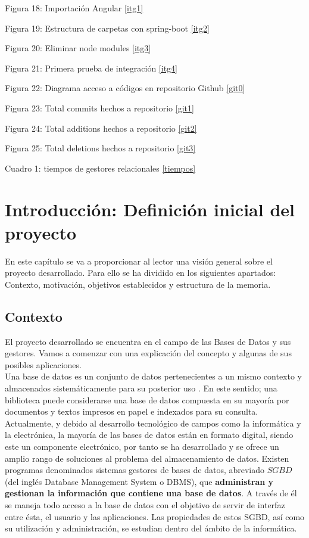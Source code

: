 \documentclass[12pt,a4paper]{article}
\begin{document}
Figura 18: Importación Angular \ref{itg1}

Figura 19: Estructura de carpetas con spring-boot \ref{itg2}

Figura 20: Eliminar node modules \ref{itg3}

Figura 21: Primera prueba de integración \ref{itg4}

Figura 22: Diagrama acceso a códigos en repositorio Github \ref{git0}

Figura 23: Total commits hechos a repositorio  \ref{git1}

Figura 24: Total additions hechos a repositorio \ref{git2}

Figura 25: Total deletions hechos a repositorio \ref{git3}

Cuadro 1: tiempos de gestores relacionales \ref{tiempos}
	






\newpage
\section{Introducción: Definición inicial del proyecto} \label{intro}

En este capítulo se va a proporcionar al lector una visión general sobre el proyecto desarrollado. Para ello se ha dividido en los siguientes apartados: Contexto, motivación, objetivos establecidos y  estructura de la memoria.
\subsection{Contexto} \label{pto11}
El proyecto desarrollado se encuentra en el campo de las Bases de Datos y sus gestores. Vamos a comenzar con una explicación del concepto y algunas de sus posibles aplicaciones.\\

Una base de datos es un conjunto de datos pertenecientes a un mismo contexto y almacenados sistemáticamente para su posterior uso \cite{BDRelacional}. En este sentido; una biblioteca puede considerarse una base de datos compuesta en su mayoría por documentos y textos impresos en papel e indexados para su consulta. Actualmente, y debido al desarrollo tecnológico de campos como la informática y la electrónica, la mayoría de las bases de datos están en formato digital, siendo este un componente electrónico, por tanto se ha desarrollado y se ofrece un amplio rango de soluciones al problema del almacenamiento de datos.
Existen programas denominados sistemas gestores de bases de datos, abreviado $SGBD$ (del inglés Database Management System o DBMS), que \textbf{administran y gestionan la información que contiene una base de datos}.
 A través de él se maneja todo acceso a la base de datos con el objetivo de servir de interfaz entre ésta, el usuario y las aplicaciones. Las propiedades de estos SGBD, así como su utilización y administración, se estudian dentro del ámbito de la informática.\\
\end{document}
